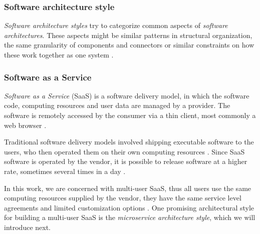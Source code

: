 \subsubsection{Software architecture style}

\emph{Software architecture styles} try to categorize common aspects of \emph{software architectures}. These aspects might be similar patterns in structural organization, the same granularity of components and connectors or similar constraints on how these work together as one system \cite{Shaw1996} \cite{fowler-microservices}.

\subsubsection{Software as a Service}

\emph{Software as a Service} (SaaS) is a software delivery model, in which the software code, computing resources and user data are managed by a provider. The software is remotely accessed by the consumer via a thin client, most commonly a web browser \cite{Carraro}.

Traditional software delivery models involved shipping executable software to the users, who then operated them on their own computing resources \cite{swebok}. Since SaaS software is operated by the vendor, it is possible to release software at a higher rate, sometimes several times in a day \cite{etsydeploy} \cite{ContinuousDelivery}.

In this work, we are concerned with multi-user SaaS, thus all users use the same computing resources supplied by the vendor, they have the same service level agreements and limited customization options \cite{salesforce} \cite{Mietzner2009} \cite{Azeez2010}. One promising architectural style for building a multi-user SaaS is the \emph{microservice architecture style}, which we will introduce next.



